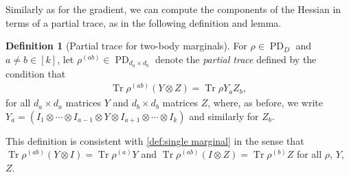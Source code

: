 \documentclass[aos]{imsart}
\theoremstyle{definition}
\newtheorem{definition}[theorem]{Definition}
\numberwithin{equation}{section}
\DeclareMathOperator{\tr}{Tr}
\DeclareMathOperator{\PD}{PD}
\newcommand{\ot}{\otimes}
\newcommand{\CF}[1]{{\color{purple}[CF: #1]}}
\begin{document}
Similarly as for the gradient, we can compute the components of the Hessian in terms of a partial trace, as in the following definition and lemma.

\begin{definition}[Partial trace for two-body marginals]
For $\rho \in \PD_D$ and $a \neq b\in[k]$, let $\rho^{(ab)} \in \PD_{d_a \times d_b}$ denote the \emph{partial trace} defined by the condition that
\begin{align*}
  \tr \rho^{(ab)} (Y \ot Z) = \tr \rho Y_a Z_b,
\end{align*}
for all $d_a \times d_a$ matrices $Y$ and $d_b \times d_b$ matrices $Z$, where, as before, we write~$Y_a = (I_1 \ot \cdots \ot I_{a-1} \ot Y \ot I_{a+1} \ot \cdots \ot I_k)$ and similarly for $Z_b$. %
\end{definition}

\noindent
This definition is consistent with \cref{def:single marginal} in the sense that $\tr \rho^{(ab)} (Y \ot I) = \tr \rho^{(a)} Y$ and $\tr \rho^{(ab)} (I \ot Z) = \tr \rho^{(b)} Z$ for all $\rho$, $Y$, $Z$.
\end{document}
